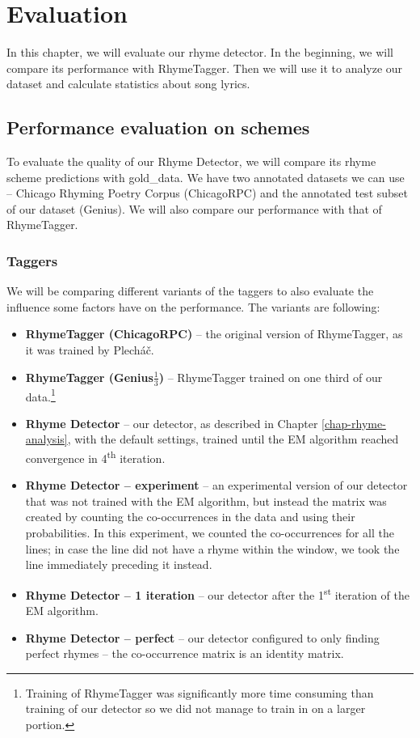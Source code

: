 \chapter{Evaluation}\label{evaluation}
In this chapter, we will evaluate our rhyme detector. In the beginning, we will compare its performance with RhymeTagger. Then we will use it to analyze our dataset and calculate statistics about song lyrics.

\section{Performance evaluation on schemes}
To evaluate the quality of our Rhyme Detector, we will compare its rhyme scheme predictions with \gls{gold_data}. We have two annotated datasets we can use -- Chicago Rhyming Poetry Corpus (ChicagoRPC) and  the annotated test subset of our dataset (Genius). We will also compare our performance with that of RhymeTagger.

\subsection{Taggers}
We will be comparing different variants of the taggers to also evaluate the influence some factors have on the performance. The variants are following:
\begin{itemize}
	\item \textbf{RhymeTagger (ChicagoRPC)} -- the original version of RhymeTagger, as it was trained by Plecháč.
	\item \textbf{RhymeTagger (Genius$\frac{1}{3}$)} -- RhymeTagger trained on one third of our data.\footnote{Training of RhymeTagger was significantly more time consuming than training of our detector so we did not manage to train in on a larger portion.}
	\item \textbf{Rhyme Detector} -- our detector, as described in Chapter \ref{chap-rhyme-analysis}, with the default settings, trained until the EM algorithm reached convergence in 4\textsuperscript{th} iteration.
	\item \textbf{Rhyme Detector -- experiment} -- an experimental version of our detector that was not trained with the EM algorithm, but instead the matrix was created by counting the co-occurrences in the data and using their probabilities. In this experiment, we counted the co-occurrences for all the lines; in case the line did not have a rhyme within the window, we took the line immediately preceding it instead.
	\item \textbf{Rhyme Detector -- 1 iteration} -- our detector after the 1\textsuperscript{st} iteration of the EM algorithm.
	\item \textbf{Rhyme Detector -- perfect} -- our detector configured to only finding perfect rhymes -- the co-occurrence matrix is an identity matrix.
\end{itemize}


